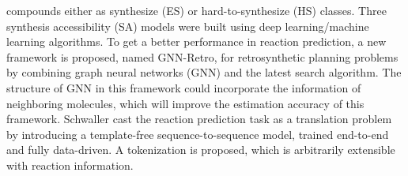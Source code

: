 \documentclass[%
 aip,
 jmp,%
 amsmath,amssymb,
 reprint,%
]{revtex4-2}
\begin{document}
compounds either as synthesize (ES) or hard-to-synthesize (HS) classes. Three synthesis accessibility (SA) models were built using deep learning/machine learning algorithms\cite{li2022prediction}.
To get a better performance in reaction prediction, a new framework is proposed, named GNN-Retro, for retrosynthetic planning problems by combining graph neural networks (GNN) and the latest search algorithm. 
The structure of GNN in this framework could incorporate the information of neighboring molecules, which will improve the estimation accuracy of this framework\cite{han2022gnn}.
Schwaller cast the reaction prediction task as a translation problem by introducing a template-free sequence-to-sequence model, trained end-to-end and fully data-driven. A tokenization is proposed, which is arbitrarily extensible with reaction information\cite{schwaller2018found}.
\end{document}
